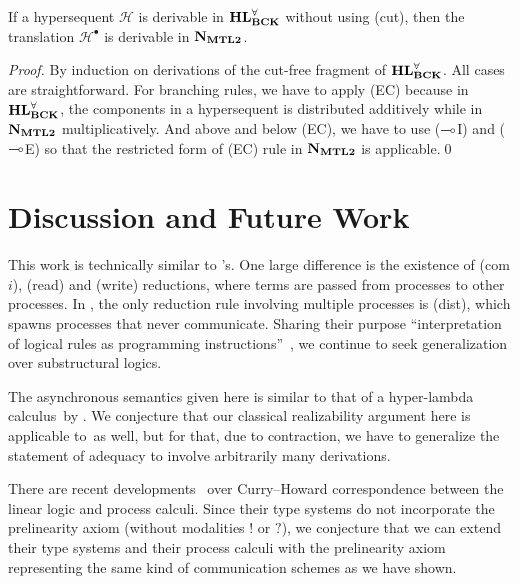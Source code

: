 \documentclass[envcountsame]{llncs}
\begin{document}
\begin{proposition}[Completeness]
 \label{prop:comp}
 If a hypersequent $\mathcal H$ is
 derivable in $\mathbf{HL}^\forall_{\mathbf{BCK}}$ without using (cut), then the translation $\mathcal H^\bullet$ is
 derivable in $\mathbf{N}_{\mathbf{MTL2}}$.
\end{proposition}
\begin{proof}
 By induction on derivations of the cut-free fragment of $\mathbf{HL}^\forall_{\mathbf{BCK}}$.
 All cases are straightforward.  For branching rules, we have to apply
 (EC) because in $\mathbf{HL}^\forall_{\mathbf{BCK}}$, the components in a hypersequent is distributed
 additively while in $\mathbf{N}_{\mathbf{MTL2}}$ multiplicatively.  And above and below
 (EC), we have to use ($\multimap$I) and ($\multimap$E) so that the
 restricted form of (EC) rule in $\mathbf{N}_{\mathbf{MTL2}}$ is applicable.\qed
\end{proof}

\section{Discussion and Future Work}
\label{sec:discuss}
This work is technically similar to \citet{danos-krivine}'s.
One large difference is the existence of (com$i$), (read) and (write)
reductions, where terms are passed from processes to other
processes.
In \citep{danos-krivine}, the only reduction rule involving multiple
processes is (dist), which spawns processes that never communicate.
Sharing their purpose
``interpretation of logical rules as programming
instructions''~\citep{danos-krivine},
we continue to seek generalization over substructural
logics.

The asynchronous semantics given here is similar to that of a
hyper-lambda calculus \lgd\,by
\citet{hiraiflops2012}.
We conjecture that our classical realizability argument here is
applicable to \lgd\,as well, but for that, due to contraction,
we have to generalize the statement of adequacy to involve arbitrarily
many derivations.

There are recent
developments~\citep{pfenning2010,wadler2012propositions} over
Curry--Howard correspondence between
the linear logic and process
calculi.
Since their type systems do not incorporate the prelinearity axiom
(without modalities $!$ or $?$),
we conjecture that we can extend their type systems and their process
calculi
with the prelinearity
axiom representing the same kind of communication schemes as we have shown.

\end{document}
